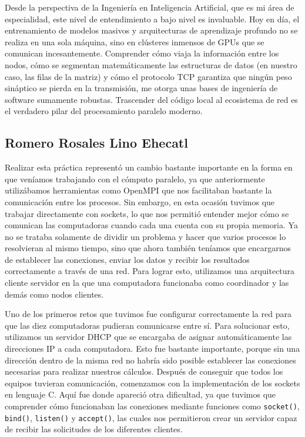 Desde la perspectiva de la Ingeniería en Inteligencia Artificial, que es mi área de especialidad, este nivel de entendimiento a bajo nivel es invaluable. Hoy en día, el entrenamiento de modelos masivos y arquitecturas de aprendizaje profundo no se realiza en una sola máquina, sino en clústeres inmensos de GPUs que se comunican incesantemente. Comprender cómo viaja la información entre los nodos, cómo se segmentan matemáticamente las estructuras de datos (en nuestro caso, las filas de la matriz) y cómo el protocolo TCP garantiza que ningún peso sináptico se pierda en la transmisión, me otorga unas bases de ingeniería de software sumamente robustas. Trascender del código local al ecosistema de red es el verdadero pilar del procesamiento paralelo moderno.

\clearpage

\subsection{Romero Rosales Lino Ehecatl}
Realizar esta práctica representó un cambio bastante importante en la forma en que veníamos trabajando con el cómputo paralelo, ya que anteriormente utilizábamos herramientas como OpenMPI que nos facilitaban bastante la comunicación entre los procesos. Sin embargo, en esta ocasión tuvimos que trabajar directamente con sockets, lo que nos permitió entender mejor cómo se comunican las computadoras cuando cada una cuenta con su propia memoria. Ya no se trataba solamente de dividir un problema y hacer que varios procesos lo resolvieran al mismo tiempo, sino que ahora también teníamos que encargarnos de establecer las conexiones, enviar los datos y recibir los resultados correctamente a través de una red. Para lograr esto, utilizamos una arquitectura cliente servidor en la que una computadora funcionaba como coordinador y las demás como nodos clientes.

Uno de los primeros retos que tuvimos fue configurar correctamente la red para que las diez computadoras pudieran comunicarse entre sí. Para solucionar esto, utilizamos un servidor DHCP que se encargaba de asignar automáticamente las direcciones IP a cada computadora. Esto fue bastante importante, porque sin una dirección dentro de la misma red no habría sido posible establecer las conexiones necesarias para realizar nuestros cálculos. Después de conseguir que todos los equipos tuvieran comunicación, comenzamos con la implementación de los sockets en lenguaje C. Aquí fue donde apareció otra dificultad, ya que tuvimos que comprender cómo funcionaban las conexiones mediante funciones como \texttt{socket()}, \texttt{bind()}, \texttt{listen()} y \texttt{accept()}, las cuales nos permitieron crear un servidor capaz de recibir las solicitudes de los diferentes clientes.

